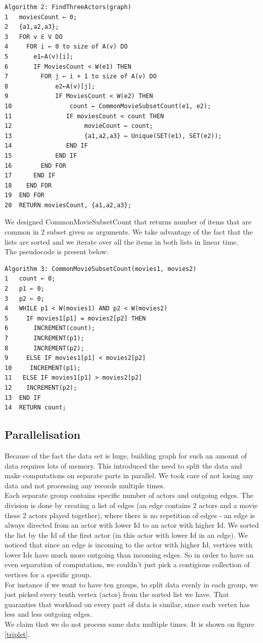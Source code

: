 \begin{verbatim}
Algorithm 2: FindThreeActors(graph)
1	moviesCount ← 0;
2	{a1,a2,a3};
3	FOR v ∈ V DO
4	  FOR i ← 0 to size of A(v) DO
5	    e1←A(v)[i];
6	    IF MoviesCount < W(e1) THEN
7	      FOR j ← i + 1 to size of A(v) DO	          
8	          e2←A(v)[j];
9	          IF MoviesCount < W(e2) THEN
10	              count ← CommonMovieSubsetCount(e1, e2);
11	             IF moviesCount < count THEN
12	                  movieCount ← count;
13	                  {a1,a2,a3} ← Unique(SET(e1), SET(e2));
14	             END IF
15	          END IF
16	      END FOR
17	    END IF
18	  END FOR
19	END FOR
20	RETURN moviesCount, {a1,a2,a3};	  	                    	  
\end{verbatim}


We designed CommonMovieSubsetCount that returns number of items that are common in 2 subset given as arguments. We take advantage of the fact that the lists are sorted and we iterate over all the items in both lists in linear time. 
\\
The pseudocode is present below:

\begin{verbatim}
Algorithm 3: CommonMovieSubsetCount(movies1, movies2)
1	count ← 0;
2	p1 ← 0;
3	p2 ← 0;
4	WHILE p1 < W(movies1) AND p2 < W(movies2)
5	  IF movies1[p1] = movies2[p2] THEN
6	    INCREMENT(count);
7	    INCREMENT(p1);
8	    INCREMENT(p2);
9	  ELSE IF movies1[p1] < movies2[p2]
10	   INCREMENT(p1);
11	 ELSE IF movies1[p1] > movies2[p2]
12	  INCREMENT(p2);
13	END IF
14	RETURN count;
\end{verbatim}

\subsection{Parallelisation}
\label{Parallelism}
Because of the fact the data set is huge, building graph for such an amount of data requires lots of memory. This introduced the need to split the data and make computations on separate parts in parallel. We took care of not losing any data and not processing any records multiple times.
\\
Each separate group contains specific number of actors and outgoing edges. The division is done by creating a list of edges (an edge contains 2 actors and a movie these 2 actors played together), where there is no repetition of edges - an edge is always directed from an actor with lower Id to an actor with higher Id. We sorted the list by the Id of the first actor (in this actor with lower Id in an edge). We noticed that since an edge is incoming to the actor with higher Id, vertices with lower Ids have much more outgoing than incoming edges. So in order to have an even separation of computation, we couldn't just pick a contigious collection of vertices for a specific group.
\\
For instance if we want to have ten groups, to split data evenly in each group, we just picked every tenth vertex (actor) from the sorted list we have. That guaranties that workload on every part of data is similar, since each vertex has less and less outgoing edges.
\\
We claim that we do not process same data multiple times. It is shown on figure \ref{triplet}.


